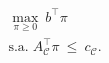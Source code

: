 \documentclass[preview]{standalone}
\begin{document}
\begin{align*}
\max_{\pi\ge 0}\ b^\top \pi\\\text{s.a.}\; A_{\mathcal{C}}^\top \pi\ \le\ c_{\mathcal{C}}.
\end{align*}
\end{document}
